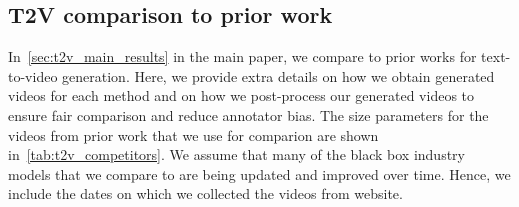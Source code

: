 \subsection{T2V comparison to prior work} \label{appendix_prior_work_details}
In~\cref{sec:t2v_main_results} in the main paper, we compare to prior works for text-to-video generation.
Here, we provide extra details on how we obtain generated videos for each method and on how we post-process our generated videos to ensure fair comparison and reduce annotator bias.
The size parameters for the videos from prior work that we use for comparion are shown in~\cref{tab:t2v_competitors}.
We assume that many of the black box industry models that we compare to are being updated and improved over time.
Hence, we include the dates on which we collected the videos from website.


\begin{table}[h!]
  \centering
  \caption{
      We compare with the above generation specification with external works.
      \RunwayGen videos are collected on September 23th, 2024.
      \LumaLabs videos are collected on September 23th, 2024.
      \Kling videos are collected on September 25th, 2024.
      The videos released from \Sora are at a variety of different resolutions and durations.
      We note that the max resolutions of the released videos is 1920$\times$1080, whereas the majority of videos are at 1280$\times$720 and 10s in duration.
  }
  \label{tab:t2v_competitors}
\end{table}

